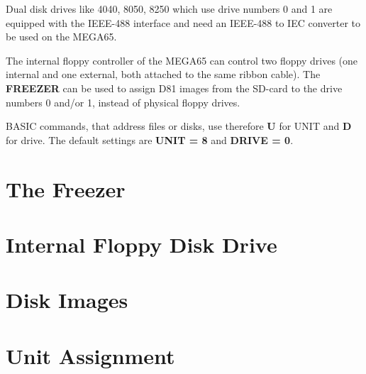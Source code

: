 Dual disk drives like 4040, 8050, 8250 which use drive numbers
0 and 1 are equipped with the IEEE-488 interface and need
an IEEE-488 to IEC converter to be used on the MEGA65.

The internal floppy controller of the MEGA65 can control
two floppy drives (one internal and one external, both attached to the same
ribbon cable). The {\bf FREEZER} can be used to assign D81 images from the
SD-card to the drive numbers 0 and/or 1, instead of physical floppy drives.

BASIC commands, that address files or disks, use therefore
{\bf U} for UNIT and {\bf D} for drive.
The default settings are {\bf UNIT = 8} and {\bf DRIVE = 0}.

\section{The Freezer}

\section{Internal Floppy Disk Drive}

\section{Disk Images}

\section{Unit Assignment}


